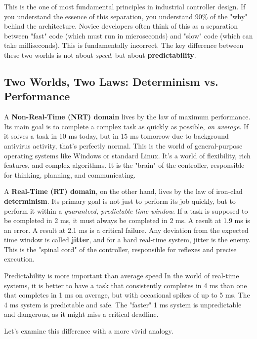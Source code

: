 This is the one of most fundamental principles in industrial controller design. If you understand the essence of this separation, you understand 90\% of the "why" behind the architecture. Novice developers often think of this as a separation between "fast" code (which must run in microseconds) and "slow" code (which can take milliseconds). This is fundamentally incorrect. The key difference between these two worlds is not about \textit{speed}, but about \textbf{predictability}.

\subsection{Two Worlds, Two Laws: Determinism vs. Performance}
\label{subsec:determinism_vs_performance}

A \textbf{Non-Real-Time (NRT) domain} lives by the law of maximum performance. Its main goal is to complete a complex task as quickly as possible, \textit{on average}. If it solves a task in 10 ms today, but in 15 ms tomorrow due to background antivirus activity, that's perfectly normal. This is the world of general-purpose operating systems like Windows or standard Linux. It's a world of flexibility, rich features, and complex algorithms. It is the "brain" of the controller, responsible for thinking, planning, and communicating.

A \textbf{Real-Time (RT) domain}, on the other hand, lives by the law of iron-clad \textbf{determinism}. Its primary goal is not just to perform its job quickly, but to perform it within a \textit{guaranteed, predictable time window}. If a task is supposed to be completed in 2 ms, it must always be completed in 2 ms. A result at 1.9 ms is an error. A result at 2.1 ms is a critical failure. Any deviation from the expected time window is called \textbf{jitter}, and for a hard real-time system, jitter is the enemy. This is the "spinal cord" of the controller, responsible for reflexes and precise execution.

\begin{principlebox}{Predictability is more important than average speed}
In the world of real-time systems, it is better to have a task that consistently completes in 4 ms than one that completes in 1 ms on average, but with occasional spikes of up to 5 ms. The 4 ms system is predictable and safe. The "faster" 1 ms system is unpredictable and dangerous, as it might miss a critical deadline.
\end{principlebox}

Let's examine this difference with a more vivid analogy.

